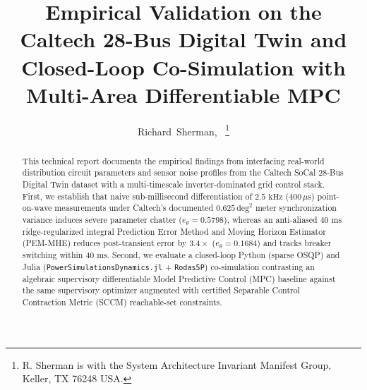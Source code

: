 \documentclass[journal]{IEEEtran}
\title{Empirical Validation on the Caltech 28-Bus Digital Twin and Closed-Loop Co-Simulation with Multi-Area Differentiable MPC}
\author{Richard~Sherman,~\IEEEmembership{Member,~IEEE}%
\thanks{R. Sherman is with the System Architecture Invariant Manifest Group, Keller, TX 76248 USA.}}
\begin{document}
\maketitle

\begin{abstract}
This technical report documents the empirical findings from interfacing real-world distribution circuit parameters and sensor noise profiles from the Caltech SoCal 28-Bus Digital Twin dataset with a multi-timescale inverter-dominated grid control stack. First, we establish that naive sub-millisecond differentiation of $2.5\text{ kHz}$ ($400\,\mu\text{s}$) point-on-wave measurements under Caltech's documented $0.625\,\text{deg}^2$ meter synchronization variance induces severe parameter chatter ($e_\theta = 0.5798$), whereas an anti-aliased $40\text{ ms}$ ridge-regularized integral Prediction Error Method and Moving Horizon Estimator (PEM-MHE) reduces post-transient error by $3.4\times$ ($e_\theta = 0.1684$) and tracks breaker switching within $40\text{ ms}$. Second, we evaluate a closed-loop Python (sparse OSQP) and Julia (\texttt{PowerSimulationsDynamics.jl} + \texttt{Rodas5P}) co-simulation contrasting an algebraic supervisory differentiable Model Predictive Control (MPC) baseline against the same supervisory optimizer augmented with certified Separable Control Contraction Metric (SCCM) reachable-set constraints.
\end{abstract}
\end{document}
